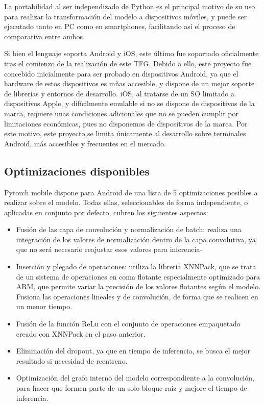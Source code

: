 La portabilidad al ser independizado de Python es el principal motivo de su uso para realizar la transformación del modelo a dispositivos móviles, y puede ser ejecutado tanto en PC como en smartphones, facilitando así el proceso de comparativa entre ambos.

Si bien el lenguaje soporta Android y iOS,  este último fue soportado oficialmente tras el comienzo de la realización de este TFG. Debido a ello, este proyecto fue concebido inicialmente para ser probado en dispositivos Android, ya que el hardware de estos dispositivos es mñas accesible, y dispone de un mejor soporte de librerías y entornos de desarrollo. iOS, al tratarse de un SO limitado a dispositivos Apple, y difícilmente emulable si no se dispone de dispositivos de la marca, requiere unas condiciones adicionales que no se pueden cumplir por limitaciones económicas, pues no disponemos de dispositivos de la marca. Por este motivo, este proyecto se limita únicamente al desarrollo sobre terminales Android, más accesibles y frecuentes en el mercado.

\subsection{Optimizaciones disponibles}

Pytorch mobile dispone para Android de una lista de 5 optimizaciones posibles a realizar sobre el modelo. Todas ellas, seleccionables de forma independiente, o aplicadas en conjunto por defecto, cubren los siguientes aspectos:

\begin{itemize}
	\item Fusión de las capa de convolución y normalización de batch: realiza una integración de los valores de normalización dentro de la capa convolutiva, ya que no será necesario reajustar esos valores para inferencia-
	\item Inserción y plegado de operaciones: utiliza la librería XNNPack, que se trata de un sistema de operaciones en coma flotante especialmente optimizado para ARM, que permite variar la precisión de los valores flotantes según el modelo. Fusiona las operaciones lineales y de convolución, de forma que se realicen en un menor tiempo.
	\item Fusión de la función ReLu con el conjunto de operaciones empaquetado creado con XNNPack en el paso anterior.
	\item Eliminación del dropout, ya que en tiempo de inferencia, se busca el mejor resultado si necesidad de reentreno.
	\item Optimización del grafo interno del modelo correspondiente a la convolución, para hacer que formen parte de un solo bloque raiz y mejore el tiempo de inferencia.	
\end{itemize}

